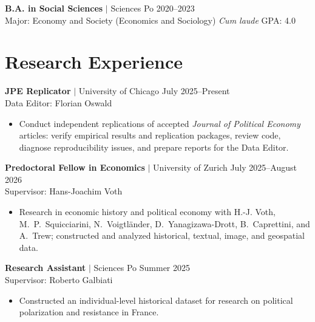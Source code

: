\documentclass[a4paper,11pt]{article}
\begin{document}
\textbf{B.A. in Social Sciences} $|$ Sciences Po \hfill 2020--2023 \\
\hspace*{1em} Major: Economy and Society (Economics and Sociology) \hfill \textit{Cum laude} \quad GPA: 4.0


\section{Research Experience}

\normalsize{\textbf{JPE Replicator} $|$ University of Chicago \hfill July 2025--Present \\
Data Editor: Florian Oswald}
\small{\begin{itemize}[itemsep=-0.1em, before=\vspace{-1em}, after=\vspace{-0.25em}]
    \item Conduct independent replications of accepted \emph{Journal of Political Economy} articles: verify empirical results and replication packages, review code, diagnose reproducibility issues, and prepare reports for the Data Editor. \\[-1.5em]
\end{itemize}}

\normalsize{\textbf{Predoctoral Fellow in Economics} $|$ University of Zurich \hfill July 2025--August 2026 \\
Supervisor: Hans-Joachim Voth}
\small{\begin{itemize}[itemsep=-0.1em, before=\vspace{-1em}, after=\vspace{-0.25em}]
    \item Research in economic history and political economy with H.-J. Voth, M.~P.~Squicciarini, N.~Voigtländer, D.~Yanagizawa-Drott, B.~Caprettini, and A.~Trew; constructed and analyzed historical, textual, image, and geospatial data. \\[-1.5em]
\end{itemize}}

\normalsize{\textbf{Research Assistant} $|$ Sciences Po \hfill Summer 2025 \\
Supervisor: Roberto Galbiati}
\small{\begin{itemize}[itemsep=-0.1em, before=\vspace{-1em}, after=\vspace{-0.25em}]
    \item Constructed an individual-level historical dataset for research on political polarization and resistance in France. \\[-1.5em]
\end{itemize}}
\end{document}
